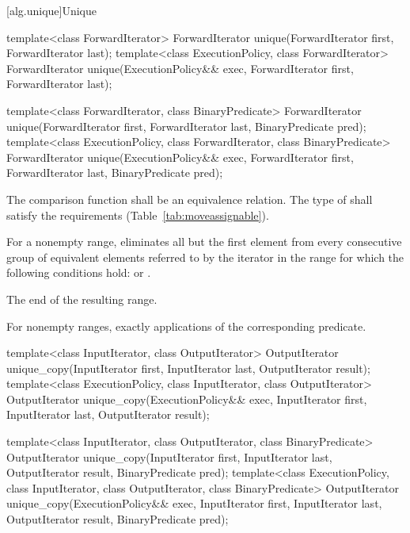 [alg.unique]{Unique}

%
\begin{itemdecl}
template<class ForwardIterator>
  ForwardIterator unique(ForwardIterator first, ForwardIterator last);
template<class ExecutionPolicy, class ForwardIterator>
  ForwardIterator unique(ExecutionPolicy&& exec,
                         ForwardIterator first, ForwardIterator last);

template<class ForwardIterator, class BinaryPredicate>
  ForwardIterator unique(ForwardIterator first, ForwardIterator last,
                         BinaryPredicate pred);
template<class ExecutionPolicy, class ForwardIterator, class BinaryPredicate>
  ForwardIterator unique(ExecutionPolicy&& exec,
                         ForwardIterator first, ForwardIterator last,
                         BinaryPredicate pred);
\end{itemdecl}

\begin{itemdescr}
\pnum
\requires
The comparison function shall be an equivalence relation.
The type of  shall satisfy the
 requirements (Table~\ref{tab:moveassignable}).

\pnum
\effects
For a nonempty range, eliminates all but the first element from every
consecutive group of equivalent elements referred to by the iterator
in the range
for which the following conditions hold:
or
.

\pnum
\returns
The end of the resulting range.

\pnum
\complexity
For nonempty ranges, exactly
applications of the corresponding predicate.
\end{itemdescr}

%
\begin{itemdecl}
template<class InputIterator, class OutputIterator>
  OutputIterator
    unique_copy(InputIterator first, InputIterator last,
                OutputIterator result);
template<class ExecutionPolicy, class InputIterator, class OutputIterator>
  OutputIterator
    unique_copy(ExecutionPolicy&& exec,
                InputIterator first, InputIterator last,
                OutputIterator result);

template<class InputIterator, class OutputIterator,
         class BinaryPredicate>
  OutputIterator
    unique_copy(InputIterator first, InputIterator last,
                OutputIterator result, BinaryPredicate pred);
template<class ExecutionPolicy, class InputIterator, class OutputIterator,
         class BinaryPredicate>
  OutputIterator
    unique_copy(ExecutionPolicy&& exec,
                InputIterator first, InputIterator last,
                OutputIterator result, BinaryPredicate pred);
\end{itemdecl}


